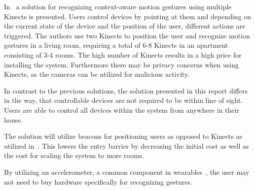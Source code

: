 In~\cite{caon2011context} a solution for recognizing context-aware motion gestures using multiple Kinects is presented. Users control devices by pointing at them and depending on the current state of the device and the position of the user, different actions are triggered.
The authors use two Kinects to position the user and recognize motion gestures in a living room, requiring a total of 6-8 Kinects in an apartment consisting of 3-4 rooms. The high number of  Kinects results in a high price for installing the system. Furthermore there may be privacy concerns when using Kinects, as the cameras can be utilized for malicious activity.

In contrast to the previous solutions, the solution presented in this report differs in the way, that controllable devices are not required to be within line of sight. Users are able to control all devices within the system from anywhere in their house.

The solution will utilize beacons for positioning users as opposed to Kinects as utilized in~\cite{caon2011context}. This lowers the entry barrier by decreasing the initial cost as well as the cost for scaling the system to more rooms.

By utilizing an accelerometer, a common component in wearables~\cite[pp. 3-4]{prespecialisation}, the user may not need to buy hardware specifically for recognizing gestures.

